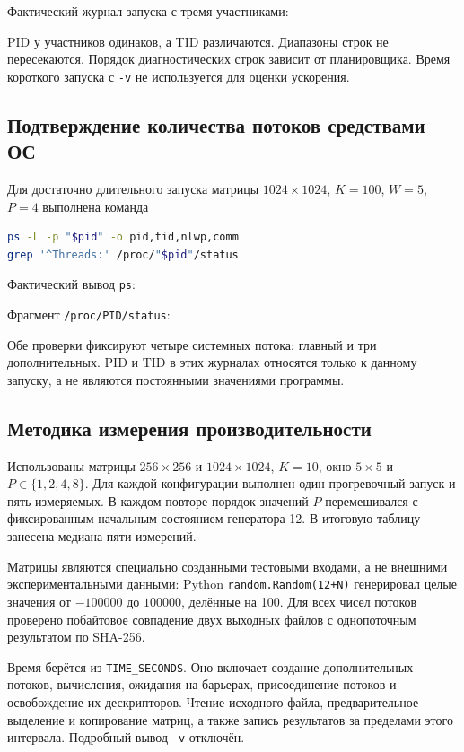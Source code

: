 Фактический журнал запуска с тремя участниками:

PID у участников одинаков, а TID различаются. Диапазоны строк
не пересекаются. Порядок диагностических строк зависит от планировщика.
Время короткого запуска с \texttt{-v} не используется для оценки ускорения.

\subsection{Подтверждение количества потоков средствами ОС}
Для достаточно длительного запуска матрицы \(1024\times1024\),
\(K=100\), \(W=5\), \(P=4\) выполнена команда
\begin{lstlisting}[language=bash,numbers=none]
ps -L -p "$pid" -o pid,tid,nlwp,comm
grep '^Threads:' /proc/"$pid"/status
\end{lstlisting}
Фактический вывод \texttt{ps}:

Фрагмент \texttt{/proc/PID/status}:

Обе проверки фиксируют четыре системных потока: главный
и три дополнительных. PID и TID в этих журналах относятся только
к данному запуску, а не являются постоянными значениями программы.

\subsection{Методика измерения производительности}
Использованы матрицы \(256\times256\) и \(1024\times1024\),
\(K=10\), окно \(5\times5\) и \(P\in\{1,2,4,8\}\).
Для каждой конфигурации выполнен один прогревочный запуск и пять
измеряемых. В каждом повторе порядок значений \(P\) перемешивался
с фиксированным начальным состоянием генератора 12.
В итоговую таблицу занесена медиана пяти измерений.

Матрицы являются специально созданными тестовыми входами, а не
внешними экспериментальными данными: Python \texttt{random.Random(12+N)}
генерировал целые значения от \(-100000\) до \(100000\), делённые на 100.
Для всех чисел потоков проверено побайтовое совпадение двух выходных
файлов с однопоточным результатом по SHA-256.

Время берётся из \texttt{TIME\_SECONDS}. Оно включает создание
дополнительных потоков, вычисления, ожидания на барьерах, присоединение
потоков и освобождение их дескрипторов. Чтение исходного файла,
предварительное выделение и копирование матриц, а также запись результатов
за пределами этого интервала. Подробный вывод \texttt{-v} отключён.

